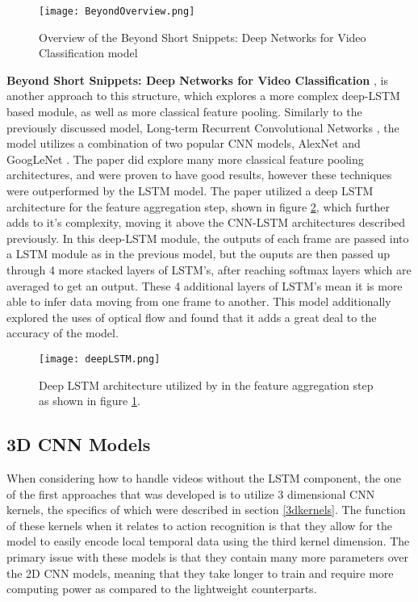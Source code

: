 \begin{figure}[ht]
	\texttt{[image: BeyondOverview.png]}
	\centering
	\caption{Overview of the Beyond Short Snippets: Deep Networks for Video Classification model \cite{beyondshortsnippets}}
	\label{fig:beyondoverview}
\end{figure}

\textbf{Beyond Short Snippets: Deep Networks for Video Classification} \cite{beyondshortsnippets}, is another approach to this structure, which explores a more complex deep-LSTM based module, as well as more classical feature pooling. Similarly to the previously discussed model, Long-term Recurrent Convolutional Networks \cite{LRCNS}, the model utilizes a combination of two popular CNN models, AlexNet \cite{alexnet} and GoogLeNet \cite{googlenet}. The paper did explore many more classical feature pooling architectures, and were proven to have good results, however these techniques were outperformed by the LSTM model. The paper utilized a deep LSTM architecture for the feature aggregation step, shown in figure \ref{fig:deeplstm}, which further adds to it's complexity, moving it above the CNN-LSTM architectures described previously. In this deep-LSTM module, the outputs of each frame are passed into a LSTM module as in the previous model, but the ouputs are then passed up through 4 more stacked layers of LSTM's, after reaching softmax layers which are averaged to get an output. These 4 additional layers of LSTM's mean it is more able to infer data moving from one frame to another. This model additionally explored the uses of optical flow and found that it adds a great deal to the accuracy of the model.

\begin{figure}[ht]
	\texttt{[image: deepLSTM.png]}
	\centering
	\caption{Deep LSTM architecture utilized by \cite{beyondshortsnippets} in the feature aggregation step as shown in figure \ref{fig:beyondoverview}.}
	\label{fig:deeplstm}
\end{figure}

\subsection{3D CNN Models}
\label{sec:3dCNNModels}

When considering how to handle videos without the LSTM component, the one of the first approaches that was developed is to utilize 3 dimensional CNN kernels, the specifics of which were described in section \ref{3dkernels}. The function of these kernels when it relates to action recognition is that they allow for the model to easily encode local temporal data using the third kernel dimension. The primary issue with these models is that they contain many more parameters over the 2D CNN models, meaning that they take longer to train and require more computing power as compared to the lightweight counterparts.

